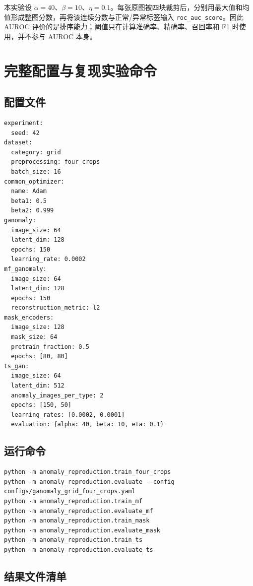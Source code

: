 \documentclass[UTF8,12pt]{ctexart}
\begin{document}
本实验设 $\alpha=40$、$\beta=10$、$\eta=0.1$。每张原图被四块裁剪后，分别用最大值和均值形成整图分数，再将该连续分数与正常/异常标签输入 \texttt{roc\_auc\_score}。因此 AUROC 评价的是排序能力；阈值只在计算准确率、精确率、召回率和 F1 时使用，并不参与 AUROC 本身。

\section{完整配置与复现实验命令}

\subsection{配置文件}

\begin{lstlisting}[style=pythonstyle,caption={配置摘录}]
experiment:
  seed: 42
dataset:
  category: grid
  preprocessing: four_crops
  batch_size: 16
common_optimizer:
  name: Adam
  beta1: 0.5
  beta2: 0.999
ganomaly:
  image_size: 64
  latent_dim: 128
  epochs: 150
  learning_rate: 0.0002
mf_ganomaly:
  image_size: 64
  latent_dim: 128
  epochs: 150
  reconstruction_metric: l2
mask_encoders:
  image_size: 128
  mask_size: 64
  pretrain_fraction: 0.5
  epochs: [80, 80]
ts_gan:
  image_size: 64
  latent_dim: 512
  anomaly_images_per_type: 2
  epochs: [150, 50]
  learning_rates: [0.0002, 0.0001]
  evaluation: {alpha: 40, beta: 10, eta: 0.1}
\end{lstlisting}

\subsection{运行命令}

\begin{lstlisting}[style=pythonstyle,caption={训练和评估命令}]
python -m anomaly_reproduction.train_four_crops
python -m anomaly_reproduction.evaluate --config configs/ganomaly_grid_four_crops.yaml
python -m anomaly_reproduction.train_mf
python -m anomaly_reproduction.evaluate_mf
python -m anomaly_reproduction.train_mask
python -m anomaly_reproduction.evaluate_mask
python -m anomaly_reproduction.train_ts
python -m anomaly_reproduction.evaluate_ts
\end{lstlisting}

\subsection{结果文件清单}
\end{document}
